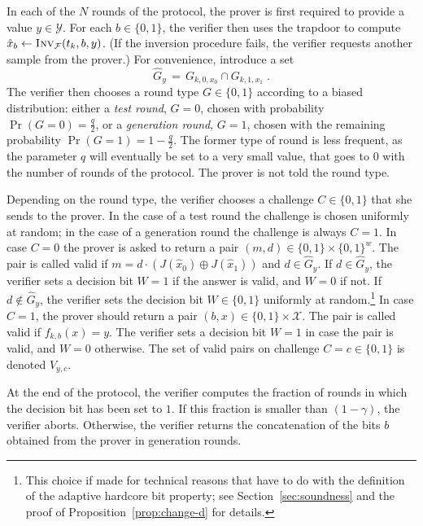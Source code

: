 \documentclass[11pt]{article}
\theoremstyle{remark}
\theoremstyle{definition}
\newcommand{\mF}{\ensuremath{\mathcal{F}}}
\newcommand{\mX}{\ensuremath{\mathcal{X}}}
\newcommand{\mY}{\ensuremath{\mathcal{Y}}}
\newcommand{\Inv}{\ensuremath{\textsc{Inv}}}
\newcommand{\dset}{G}
\newcommand{\inj}{J}
\begin{document}
In each of the $N$ rounds of the protocol, the prover is first required to provide a value $y\in\mY$. For each $b\in\{0,1\}$, the verifier then uses the trapdoor to compute $\hat{x}_b\leftarrow \Inv_\mF(t_k,b,y)$. (If the inversion procedure fails, the verifier requests another sample from the prover.) For convenience, introduce a set 
\begin{equation}\label{eq:def-gy}
 \hat{\dset}_y \,=\, \dset_{k,0,x_0} \cap \dset_{k,1,x_1}\;.
\end{equation}
The verifier then chooses a round type $G\in\{0,1\}$ according to a biased distribution: either a \emph{test round}, $G=0$, chosen with probability $\Pr(G=0)=\frac{q}{2}$, or a \emph{generation round}, $G=1$, chosen with the remaining probability $\Pr(G=1)=1-\frac{q}{2}$. The former type of round is less frequent, as the parameter $q$ will eventually be set to a very small value, that goes to $0$ with the number of rounds of the protocol. The prover is not told the round type. 

Depending on the round type, the verifier chooses a challenge $C\in\{0,1\}$ that she sends to the prover. In the case of a test round the challenge is chosen uniformly at random; in the case of a generation round the challenge is always $C=1$. In case $C=0$ the prover is asked to return a pair $(m,d)\in \{0,1\}\times\{0,1\}^w$. The pair is called valid if $m=d\cdot(\inj(\hat{x}_0)\oplus \inj(\hat{x}_1))$ and $d\in\hat{\dset}_{y}$. If $d\in\hat{\dset}_y$, the verifier sets a decision bit $W=1$ if the answer is valid, and $W=0$ if not. If $d\notin \hat{\dset}_y$, the verifier sets the decision bit $W\in\{0,1\}$ uniformly at random.\footnote{This choice if made for technical reasons that have to do with the definition of the adaptive hardcore bit property; see Section~\ref{sec:soundness} and the proof of Proposition~\ref{prop:change-d} for details.}
In case $C=1$, the prover should return  a pair $(b,x)\in \{0,1\}\times\mX$. The pair is called valid if $f_{k,b}(x)=y$. The verifier sets a decision bit $W=1$ in case the pair is valid, and $W=0$ otherwise. The set of valid pairs on challenge $C=c\in\{0,1\}$ is denoted $V_{y,c}$. 

At the end of the protocol, the verifier computes the fraction of rounds in which the decision bit has been set to $1$. If this fraction is smaller than $(1-\gamma)$, the verifier aborts. Otherwise, the verifier returns the concatenation of the bits $b$ obtained from the prover in generation rounds.
\end{document}
